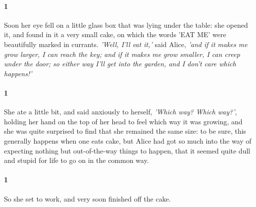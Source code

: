 \documentclass[12pt]{article}
\begin{document}
\paragraph{1} Soon her eye fell on a little glass box that was lying under the table:
she opened it, and found in it a very small cake, on which the words
\textmd{'EAT ME'} were beautifully marked in currants. \textit{'Well, I'll eat it,'} said
Alice, \textit{'and if it makes me grow larger, I can reach the key; and if it
makes me grow smaller, I can creep under the door; so either way I'll
get into the garden, and I don't care which happens!'}


\paragraph{1} She ate a little bit, and said anxiously to herself, \textit{'Which way? Which
    way?'}, holding her hand on the top of her head to feel which way it was
growing, and she was quite surprised to find that she remained the same
size: to be sure, this generally happens when one eats cake, but Alice
had got so much into the way of expecting nothing but out-of-the-way
things to happen, that it seemed quite dull and stupid for life to go on
in the common way.


\paragraph{1} So she set to work, and very soon finished off the cake.
\end{document}
